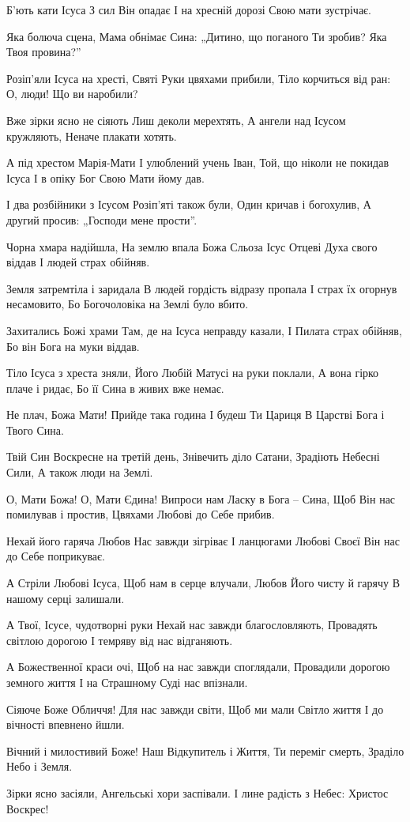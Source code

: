 Б’ють кати Ісуса
З сил Він опадає
І на хресній дорозі
Свою мати зустрічає.

Яка болюча сцена,
Мама обнімає Сина:
„Дитино, що поганого Ти зробив?
Яка Твоя провина?”

Розіп’яли Ісуса на хресті,
Святі Руки цвяхами прибили,
Тіло корчиться від ран:
О, люди! Що ви наробили?

Вже зірки ясно не сіяють
Лиш деколи мерехтять,
А ангели над Ісусом кружляють,
Неначе плакати хотять.

А під хрестом Марія-Мати
І улюблений учень Іван,
Той, що ніколи не покидав Ісуса
І в опіку Бог Свою Мати йому дав.

І два розбійники з Ісусом
Розіп’яті також були,
Один кричав і богохулив,
А другий просив: „Господи мене прости”.

Чорна хмара надійшла,
На землю впала Божа Сльоза
Ісус Отцеві Духа свого віддав
І людей страх обійняв.

Земля затремтіла і заридала
В людей гордість відразу пропала
І страх їх огорнув несамовито,
Бо Богочоловіка на Землі було вбито.

Захитались Божі храми
Там, де на Ісуса неправду казали,
І Пилата страх обійняв,
Бо він Бога на муки віддав.

Тіло Ісуса з хреста зняли,
Його Любій Матусі на руки поклали,
А вона гірко плаче і ридає,
Бо її Сина в живих вже немає.

Не плач, Божа Мати!
Прийде така година
І будеш Ти Цариця
В Царстві Бога і Твого Сина.

Твій Син Воскресне на третій день,
Знівечить діло Сатани,
Зрадіють Небесні Сили,
А також люди на Землі.

О, Мати Божа! О, Мати Єдина!
Випроси нам Ласку в Бога – Сина,
Щоб Він нас помилував і простив,
Цвяхами Любові до Себе прибив.

Нехай його гаряча Любов
Нас завжди зігріває
І ланцюгами Любові Своєї
Він нас до Себе поприкуває.

А Стріли Любові Ісуса,
Щоб нам в серце влучали,
Любов Його чисту й гарячу
В нашому серці залишали.

А Твої, Ісусе, чудотворні руки
Нехай нас завжди благословляють,
Провадять світлою дорогою
І темряву від нас відганяють.

А Божественної краси очі,
Щоб на нас завжди споглядали,
Провадили дорогою земного життя
І на Страшному Суді нас впізнали.

Сіяюче Боже Обличчя!
Для нас завжди світи,
Щоб ми мали Світло життя
І до вічності впевнено йшли.

Вічний і милостивий Боже!
Наш Відкупитель і Життя,
Ти переміг смерть,
Зраділо Небо і Земля.

Зірки ясно засіяли,
Ангельські хори заспівали.
І лине радість з Небес:
Христос Воскрес!
